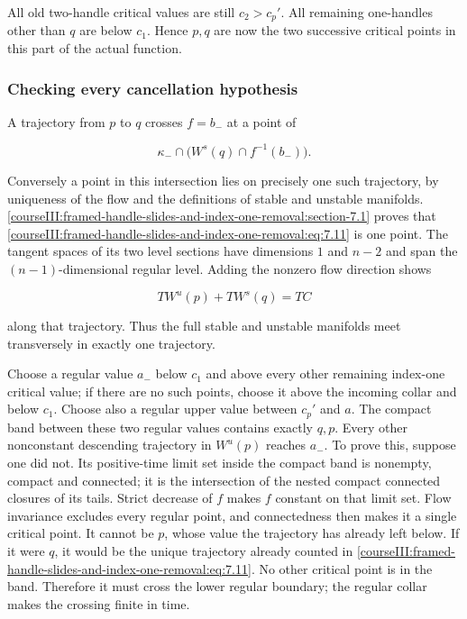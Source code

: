 All old two-handle critical values are still \(c_2>c_p'\). All remaining one-handles other than \(q\) are below \(c_1\). Hence \(p,q\) are now the two successive critical points in this part of the actual function.

\subsubsection{Checking every cancellation hypothesis}
\label{courseIII:framed-handle-slides-and-index-one-removal:section-7.2}

A trajectory from \(p\) to \(q\) crosses \(f=b_-\) at a point of

\begin{equation}
\kappa_-\cap\bigl(W^s(q)\cap f^{-1}(b_-)\bigr).
 \label{courseIII:framed-handle-slides-and-index-one-removal:eq:7.11}
\end{equation}

Conversely a point in this intersection lies on precisely one such trajectory, by uniqueness of the flow and the definitions of stable and unstable manifolds. \cref{courseIII:framed-handle-slides-and-index-one-removal:section-7.1} proves that \eqref{courseIII:framed-handle-slides-and-index-one-removal:eq:7.11} is one point. The tangent spaces of its two level sections have dimensions \(1\) and \(n-2\) and span the \((n-1)\)-dimensional regular level. Adding the nonzero flow direction shows

\begin{equation}
T W^u(p)+T W^s(q)=TC
 \label{courseIII:framed-handle-slides-and-index-one-removal:eq:7.12}
\end{equation}

along that trajectory. Thus the full stable and unstable manifolds meet transversely in exactly one trajectory.

Choose a regular value \(a_-\) below \(c_1\) and above every other remaining index-one critical value; if there are no such points, choose it above the incoming collar and below \(c_1\). Choose also a regular upper value between \(c_p'\) and \(a\). The compact band between these two regular values contains exactly \(q,p\). Every other nonconstant descending trajectory in \(W^u(p)\) reaches \(a_-\). To prove this, suppose one did not. Its positive-time limit set inside the compact band is nonempty, compact and connected; it is the intersection of the nested compact connected closures of its tails. Strict decrease of \(f\) makes \(f\) constant on that limit set. Flow invariance excludes every regular point, and connectedness then makes it a single critical point. It cannot be \(p\), whose value the trajectory has already left below. If it were \(q\), it would be the unique trajectory already counted in \eqref{courseIII:framed-handle-slides-and-index-one-removal:eq:7.11}. No other critical point is in the band. Therefore it must cross the lower regular boundary; the regular collar makes the crossing finite in time.

